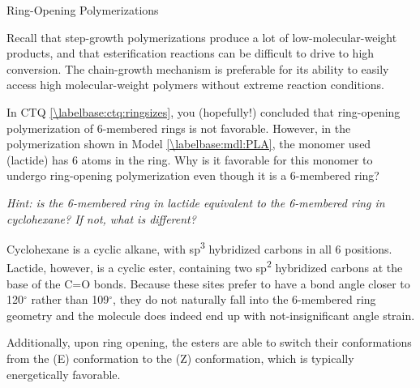 \begin{activity}{Ring-Opening Polymerizations}
\begin{ctqs}
\begin{enumerate}
				\begin{solution}[1.5in]{}
					Recall that step-growth polymerizations produce a lot of low-molecular-weight products, and that esterification reactions can be difficult to drive to high conversion.  The chain-growth mechanism is preferable for its ability to easily access high molecular-weight polymers without extreme reaction conditions.
				\end{solution}
		\end{enumerate}
	
\end{ctqs}




\begin{exercises}

	\exercise In CTQ \ref{\labelbase:ctq:ringsizes}, you (hopefully!) concluded that ring-opening polymerization of 6-membered rings is not favorable.  However, in the polymerization shown in Model \ref{\labelbase:mdl:PLA}, the monomer used (lactide) has 6 atoms in the ring.  Why is it favorable for this monomer to undergo ring-opening polymerization even though it is a 6-membered ring?
	
		\emph{Hint: is the 6-membered ring in lactide equivalent to the 6-membered ring in cyclohexane?  If not, what is different?}
	
		\begin{solution}{}
			Cyclohexane is a cyclic alkane, with sp\textsuperscript{3} hybridized carbons in all 6 positions.  Lactide, however, is a cyclic ester, containing two sp\textsuperscript{2} hybridized carbons at the base of the C=O bonds.  Because these sites prefer to have a bond angle closer to 120$^\circ$ rather than 109$^\circ$, they do not naturally fall into the 6-membered ring geometry and the molecule does indeed end up with not-insignificant angle strain.
			
			Additionally, upon ring opening, the esters are able to switch their conformations from the (E) conformation to the (Z) conformation, which is typically energetically favorable.
		\end{solution}
	
\end{exercises}


%
%	


	
\end{activity}